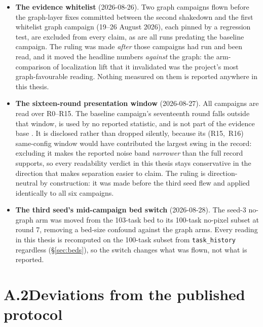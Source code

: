 \begin{itemize}
  \item \textbf{The evidence whitelist} (2026-08-26). Two graph campaigns
        flown before the graph-layer fixes committed between the second
        shakedown and the first whitelist graph campaign (19--26 August
        2026), each pinned by a regression test, are excluded from every
        claim, as are all runs predating the baseline campaign. The ruling
        was made \emph{after} those campaigns had run and been read, and it
        moved the headline numbers \emph{against} the graph: the
        arm-comparison of localization lift that it invalidated was the
        project's most graph-favourable reading. Nothing measured on them
        is reported anywhere in this thesis.
  \item \textbf{The sixteen-round presentation window} (2026-08-27). All
        campaigns are read over R0--R15. The baseline campaign's
        seventeenth round falls outside that window, is used by no
        reported statistic, and is not part of the evidence base
        . It is disclosed rather than dropped silently, because its
        \mbox{(R15, R16)} same-config window would have contributed the
        largest swing in the record: excluding it makes the reported
        noise band \emph{narrower} than the full record supports, so
        every readability verdict in this thesis stays conservative in
        the direction that makes separation easier to claim. The
        ruling is direction-neutral by construction: it was made before the
        third seed flew and applied identically to all six campaigns.
  \item \textbf{The third seed's mid-campaign bed switch} (2026-08-28). The
        seed-3 no-graph arm was moved from the 103-task bed to its 100-task
        no-pixel subset at round 7, removing a bed-size confound against
        the graph arms. Every reading in this thesis is recomputed on the
        100-task subset from \texttt{task\_history} regardless
        (\S\ref{sec:beds}), so the switch changes what was flown, not what
        is reported.
\end{itemize}

\section*{A.2\quad Deviations from the published protocol}

